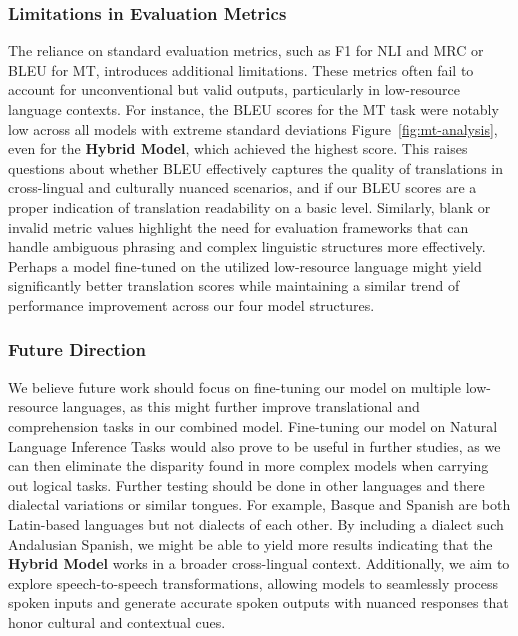 \subsubsection{Limitations in Evaluation Metrics}
The reliance on standard evaluation metrics, such as F1 for NLI and MRC or BLEU for MT, introduces additional limitations. These metrics often fail to account for unconventional but valid outputs, particularly in low-resource language contexts. For instance, the BLEU scores for the MT task were notably low across all models with extreme standard deviations Figure~\ref{fig:mt-analysis}, even for the \textbf{Hybrid Model}, which achieved the highest score. This raises questions about whether BLEU effectively captures the quality of translations in cross-lingual and culturally nuanced scenarios, and if our BLEU scores are a proper indication of translation readability on a basic level. Similarly, blank or invalid metric values highlight the need for evaluation frameworks that can handle ambiguous phrasing and complex linguistic structures more effectively. Perhaps a model fine-tuned on the utilized low-resource language might yield significantly better translation scores while maintaining a similar trend of performance improvement across our four model structures.


\subsubsection{Future Direction}
We believe future work should focus on fine-tuning our model on multiple low-resource languages, as this might further improve translational and comprehension tasks in our combined model. Fine-tuning our model on Natural Language Inference Tasks would also prove to be useful in further studies, as we can then eliminate the disparity found in more complex models when carrying out logical tasks. 
Further testing should be done in other languages and there dialectal variations or similar tongues. For example, Basque and Spanish are both Latin-based languages but not dialects of each other. By including a dialect such Andalusian Spanish, we might be able to yield more results indicating that the \textbf{Hybrid Model} works in a broader cross-lingual context. 
Additionally, we aim to explore speech-to-speech transformations, allowing models to seamlessly process spoken inputs and generate accurate spoken outputs with nuanced responses that honor cultural and contextual cues.










